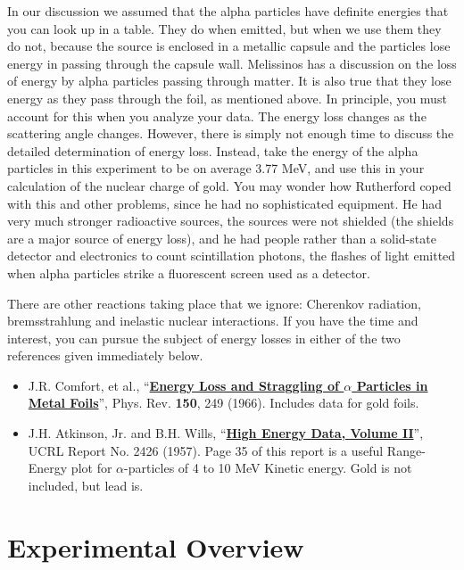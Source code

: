 \documentclass{../lab}
\begin{document}
In our discussion we assumed that the alpha particles have definite energies that you can look up in a table. They do when emitted, but when we use them they do not, because the source is enclosed in a metallic capsule and the particles lose energy in passing through the capsule wall. Melissinos has a discussion on the loss of energy by alpha particles passing through matter. It is also true that they lose energy as they pass through the foil, as mentioned above.  In principle, you must account for this when you analyze your data. The energy loss changes as the scattering angle changes. However, there is simply not enough time to discuss the detailed determination of energy loss. Instead, take the energy of the alpha particles in this experiment to be on average 3.77 MeV, and use this in your calculation of the nuclear charge of gold. You may wonder how Rutherford coped with this and other problems, since he had no sophisticated equipment. He had very much stronger radioactive sources, the sources were not shielded (the shields are a major source of energy loss), and he had people rather than a solid-state detector and electronics to count scintillation photons, the flashes of light emitted when alpha particles strike a fluorescent screen used as a detector.

There are other reactions taking place that we ignore: Cherenkov radiation, bremsstrahlung and inelastic nuclear interactions. If you have the time and interest, you can pursue the subject of energy losses in either of the two references given immediately below.

\begin{itemize}
    \item J.R. Comfort, et al., ``\href{http://physics111.lib.berkeley.edu/Physics111/Reprints/RUT/01-Energy\_Loss\_and\_Straggling.pdf}{\textbf{Energy Loss and Straggling of $ \alpha $ Particles in Metal Foils}}'', Phys. Rev. {\textbf {150}}, 249 (1966). Includes data for gold foils.

    \item J.H. Atkinson, Jr. and B.H. Wills, ``\href{http://physics111.lib.berkeley.edu/Physics111/Reprints/RUT/02-High\_Energy\_Particle\_Data.pdf}{\textbf{High Energy Data, Volume II}}'', UCRL Report No. 2426 (1957). Page 35 of this report is a useful Range-Energy plot for $ \alpha $-particles of 4 to 10 MeV Kinetic energy. Gold is not included, but lead is.
\end{itemize}

\newpage

\section{Experimental Overview}
\end{document}
